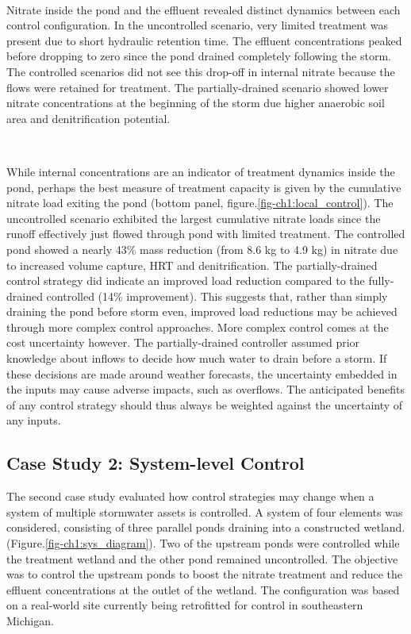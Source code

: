 \

Nitrate inside the pond and the effluent revealed distinct dynamics between each
control configuration. In the uncontrolled scenario, very limited treatment was
present due to short hydraulic retention time. The effluent concentrations
peaked before dropping to zero since the pond drained completely following the
storm. The controlled scenarios did not see this drop-off in internal nitrate
because the flows were retained for treatment. The partially-drained scenario
showed lower nitrate concentrations at the beginning of the storm due higher
anaerobic
soil area and denitrification potential.

\

While internal concentrations are an indicator of treatment dynamics inside the pond, perhaps the best measure of treatment capacity is given by the cumulative nitrate load exiting the pond (bottom panel, figure.\ref{fig-ch1:local_control}). The uncontrolled scenario exhibited the largest cumulative nitrate loads since the runoff effectively just flowed through pond with limited treatment. The controlled pond showed a nearly 43\% mass reduction (from 8.6 kg to 4.9 kg) in nitrate due to increased volume capture, HRT and denitrification. The partially-drained control strategy did indicate an improved load reduction compared to the fully-drained controlled (14\% improvement). This suggests that, rather than simply draining the pond before storm even, improved load reductions may be achieved through more complex control approaches. More complex control comes at the cost uncertainty however. The partially-drained controller assumed prior knowledge about inflows to decide how much water to drain before a storm. If these decisions are made around weather forecasts, the uncertainty embedded in the inputs may cause adverse impacts, such as overflows. The anticipated benefits of any control strategy should thus always be weighted against the uncertainty of any inputs. 



\subsection{Case Study 2: System-level Control}

The second case study evaluated how control strategies may change when a system of multiple stormwater assets is controlled. 
A system of four elements was considered, consisting of three parallel ponds draining into a constructed wetland.  (Figure.\ref{fig-ch1:sys_diagram}). 
Two of the upstream ponds were controlled while the treatment wetland and the other pond remained uncontrolled. 
The objective was to control the upstream ponds to boost the nitrate treatment and reduce the effluent concentrations at the outlet of the wetland. 
The configuration was based on a real-world site currently being retrofitted for control in southeastern Michigan. 

